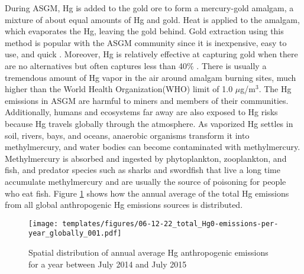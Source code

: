 \begin{flushleft} 
During ASGM, Hg is added to the gold ore to form a mercury-gold amalgam, a mixture of about equal amounts of Hg and gold\cite{united_nations_environment_programme_reducing_2012}. Heat is applied to the amalgam, which evaporates the Hg, leaving the gold behind. Gold extraction using this method is popular with the ASGM community since it is inexpensive, easy to use, and quick \cite{united_nations_environment_programme_reducing_2012}. Moreover, Hg is relatively effective at capturing gold when there are no alternatives but often captures less than 40\% \cite{united_nations_environment_programme_developing_2015}. There is usually a tremendous amount of Hg vapor in the air around amalgam burning sites, much higher than the World Health Organization(WHO) limit of 1.0 $\mu$g/m$^{3}$\cite{gibb_mercury_2014}. The Hg emissions in ASGM are harmful to miners and members of their communities.
Additionally, humans and ecosystems far away are also exposed to Hg risks because Hg travels globally through the atmosphere. As vaporized Hg settles in soil, rivers, bays, and oceans, anaerobic organisms transform it into methylmercury, and water bodies can become contaminated with methylmercury\cite{united_nations_environment_programme_technical_2019}. Methylmercury is absorbed and ingested by phytoplankton, zooplankton, and fish, and predator species such as sharks and swordfish that live a long time accumulate methylmercury and are usually the source of poisoning for people who eat fish\cite{gibb_mercury_2014}. Figure \ref{fig:world_hg_emisions} shows how the annual average of the total Hg emissions from  all global anthropogenic Hg emissions sources is distributed. 
\end{flushleft}

\begin{figure}[H]
  \texttt{[image: templates/figures/06-12-22\_total\_Hg0-emissions-per-year\_globally\_001.pdf]}
  \centering
  \caption{Spatial distribution of annual average Hg anthropogenic emissions for a year between July 2014 and July 2015 \cite{united_nations_environment_programme_technical_2019}}
  \label{fig:world_hg_emisions}
\end{figure}
\FloatBarrier

